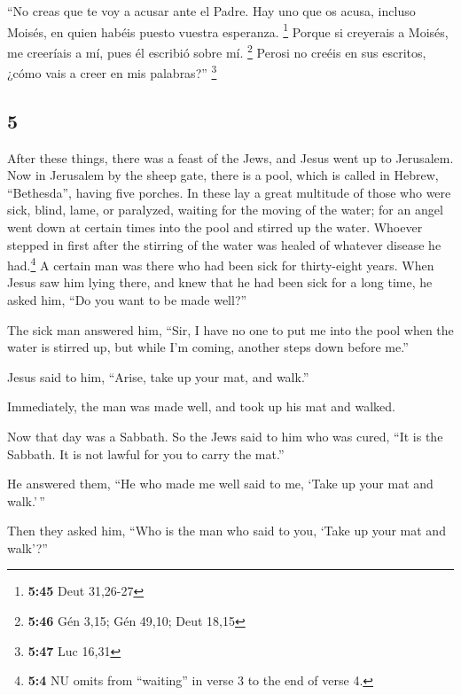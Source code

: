 \begin{paracol}{2}
 ``No creas que te voy a acusar ante el Padre. Hay uno
que os acusa, incluso Moisés, en quien habéis puesto vuestra esperanza.
\footnote{\textbf{5:45} Deut 31,26-27}  Porque si
creyerais a Moisés, me creeríais a mí, pues él escribió sobre mí.
\footnote{\textbf{5:46} Gén 3,15; Gén 49,10; Deut 18,15} 
Perosi no creéis en sus escritos, ¿cómo vais a creer en mis palabras?''
\footnote{\textbf{5:47} Luc 16,31}

\switchcolumn
\begin{otherlanguage}{english}

\hypertarget{section-9}{%
\section{5}\label{section-9}}

 After these things, there was a feast of the Jews, and
Jesus went up to Jerusalem.  Now in Jerusalem by the sheep
gate, there is a pool, which is called in Hebrew, ``Bethesda'', having
five porches.  In these lay a great multitude of those who
were sick, blind, lame, or paralyzed, waiting for the moving of the
water;  for an angel went down at certain times into the
pool and stirred up the water. Whoever stepped in first after the
stirring of the water was healed of whatever disease he had.\footnote{\textbf{5:4}
  NU omits from ``waiting'' in verse 3 to the end of verse 4.}
 A certain man was there who had been sick for
thirty-eight years.  When Jesus saw him lying there, and
knew that he had been sick for a long time, he asked him, ``Do you want
to be made well?''

 The sick man answered him, ``Sir, I have no one to put me
into the pool when the water is stirred up, but while I'm coming,
another steps down before me.''

 Jesus said to him, ``Arise, take up your mat, and walk.''

 Immediately, the man was made well, and took up his mat
and walked.

Now that day was a Sabbath.  So the Jews said to him who
was cured, ``It is the Sabbath. It is not lawful for you to carry the
mat.''

 He answered them, ``He who made me well said to me,
`Take up your mat and walk.'\,''

 Then they asked him, ``Who is the man who said to you,
`Take up your mat and walk'?''


\end{otherlanguage}
\end{paracol}
